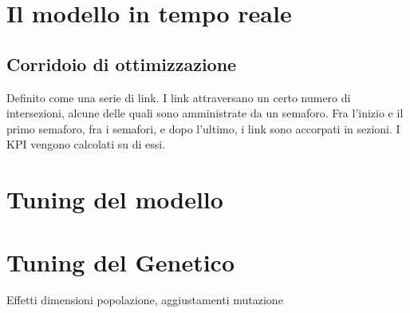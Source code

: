 \section{Il modello in tempo reale}

\subsection{Corridoio di ottimizzazione}
Definito come una serie di link.
I link attraversano un certo numero di intersezioni, alcune delle quali sono amministrate da un semaforo.
Fra l'inizio e il primo semaforo, fra i semafori, e dopo l'ultimo, i link sono accorpati in sezioni. I KPI vengono calcolati su di essi.

\section{Tuning del modello}


\section{Tuning del Genetico}
Effetti dimensioni popolazione, aggiustamenti mutazione